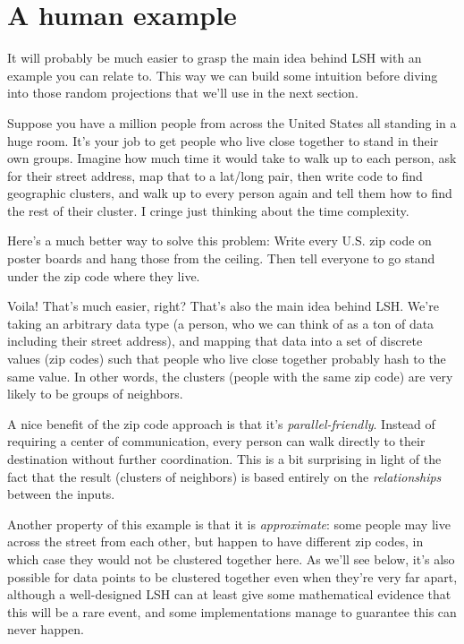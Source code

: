 \documentclass[20pt,]{extarticle}
\begin{document}
\section{A human example}\label{a-human-example}

It will probably be much easier to grasp the main idea behind LSH with
an example you can relate to. This way we can build some intuition
before diving into those random projections that we'll use in the next
section.

Suppose you have a million people from across the United States all
standing in a huge room. It's your job to get people who live close
together to stand in their own groups. Imagine how much time it would
take to walk up to each person, ask for their street address, map that
to a lat/long pair, then write code to find geographic clusters, and
walk up to every person again and tell them how to find the rest of
their cluster. I cringe just thinking about the time complexity.

Here's a much better way to solve this problem: Write every U.S. zip
code on poster boards and hang those from the ceiling. Then tell
everyone to go stand under the zip code where they live.

Voila! That's much easier, right? That's also the main idea behind LSH.
We're taking an arbitrary data type (a person, who we can think of as a
ton of data including their street address), and mapping that data into
a set of discrete values (zip codes) such that people who live close
together probably hash to the same value. In other words, the clusters
(people with the same zip code) are very likely to be groups of
neighbors.

A nice benefit of the zip code approach is that it's
\emph{parallel-friendly}. Instead of requiring a center of
communication, every person can walk directly to their destination
without further coordination. This is a bit surprising in light of the
fact that the result (clusters of neighbors) is based entirely on the
\emph{relationships} between the inputs.

Another property of this example is that it is \emph{approximate}: some
people may live across the street from each other, but happen to have
different zip codes, in which case they would not be clustered together
here. As we'll see below, it's also possible for data points to be
clustered together even when they're very far apart, although a
well-designed LSH can at least give some mathematical evidence that this
will be a rare event, and some implementations manage to guarantee this
can never happen.
\end{document}

